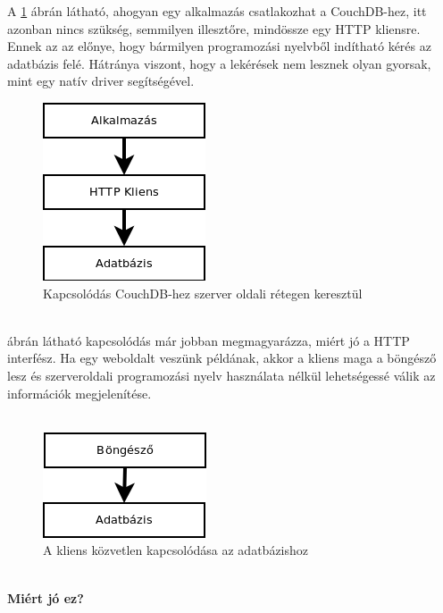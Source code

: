 		A \ref{fig:conn_int_couchdb_expr} ábrán látható, ahogyan egy alkalmazás csatlakozhat a CouchDB-hez, itt azonban nincs szükség, semmilyen illesztőre, mindössze egy HTTP kliensre. Ennek az az előnye, hogy bármilyen programozási nyelvből indítható kérés az adatbázis felé. Hátránya viszont, hogy a lekérések nem lesznek olyan gyorsak, mint egy natív driver segítségével.
		\begin{figure}[ht]
			\centering
				\includegraphics[scale=0.7]{pictures/conn_int_couchdb_expr.png}%
				\caption{Kapcsolódás CouchDB-hez szerver oldali rétegen keresztül}
				\label{fig:conn_int_couchdb_expr}
		\end{figure}
		\\
		 ábrán látható kapcsolódás már jobban megmagyarázza, miért jó a HTTP interfész. Ha egy weboldalt veszünk példának, akkor a kliens maga a böngésző lesz és szerveroldali programozási nyelv használata nélkül lehetségessé válik az információk megjelenítése. \\
		\hfill\\
		\clearpage
		\begin{figure}[ht]
			\centering
				\includegraphics[scale=0.7]{pictures/conn_int_couchdb_simple.png}%
				\caption{A kliens közvetlen kapcsolódása az adatbázishoz}
				\label{fig:conn_int_couchdb_simple}
		\end{figure}
		\hfill\\
		\textbf{Miért jó ez?} \hfill \\
